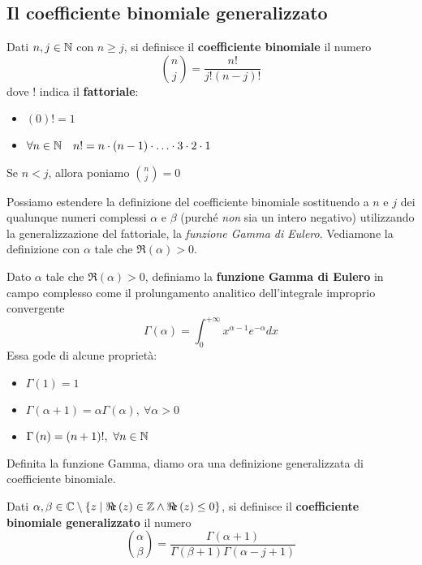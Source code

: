 \subsection{Il coefficiente binomiale generalizzato}\label{coefficientebinomialgeneralizzato}
\begin{define}
	Dati $n,j\in\mathbb{N}$ con $n\geq j$, si definisce il \textbf{coefficiente binomiale} il numero
	\begin{equation}
		\binom{n}{j}=\frac{n!}{j!\left(n-j\right)!}
	\end{equation}
dove $!$ indica il \textbf{fattoriale}:
\begin{itemize}
	\item $\left(0\right)!=1$
	\item $\forall n\in\mathbb{N}\quad n!=n\cdot \left(n-1\right)\cdot \ldots \cdot 3 \cdot 2 \cdot 1$
\end{itemize}
Se $n<j$, allora poniamo $\displaystyle\binom{n}{j}=0$
\end{define}
Possiamo estendere la definizione del coefficiente binomiale sostituendo a $n$ e $j$ dei qualunque numeri complessi $\alpha$ e $\beta$ (purché \textit{non} sia un intero negativo)  utilizzando la generalizzazione del fattoriale, la \textit{funzione Gamma di Eulero}. Vediamone la definizione con $\alpha$ tale che $\Re\left(\alpha\right)>0$.
\begin{define}
	Dato $\alpha$ tale che $\Re\left(\alpha\right)>0$, definiamo la \textbf{funzione Gamma di Eulero} in campo complesso come il prolungamento analitico dell'integrale improprio convergente
	\begin{equation}
		\Gamma\left(\alpha\right)=\int_{0}^{+\infty}x^{\alpha-1}e^{-\alpha}dx
	\end{equation}
	Essa gode di alcune proprietà:
	\begin{itemize}
		\item $\Gamma\left(1\right)=1$
		\item $\Gamma\left(\alpha+1\right)=\alpha\Gamma\left(\alpha\right),\ \forall\alpha>0$
		\item $\Gamma\left(n\right)=\left(n+1\right)!,\ \forall n\in\mathbb{N}$
	\end{itemize}
\end{define}
Definita la funzione Gamma, diamo ora una definizione generalizzata di coefficiente binomiale.
\begin{define}
	Dati $\alpha,\beta\in\complexset\setminus\left\{z\mid\Re\left(z\right)\in\integerset\wedge\Re\left(z\right)\leq0\right\}$, si definisce il \textbf{coefficiente binomiale generalizzato} il numero
	\begin{equation}
		\binom{\alpha}{\beta}=\frac{\Gamma\left(\alpha+1\right)}{\Gamma\left(\beta+1\right)\Gamma\left(\alpha-j+1\right)}
	\end{equation}
\end{define}
